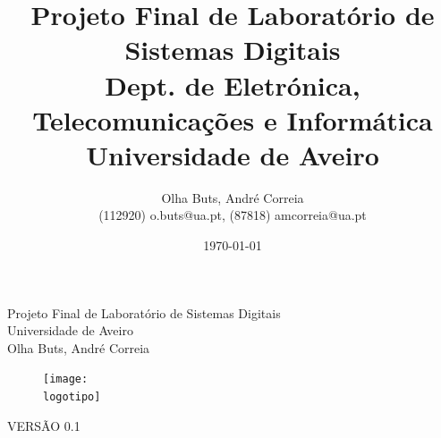 \documentclass{report}
\begin{document}
%
\def\titulo{Projeto Final de Laboratório de Sistemas Digitais}
\def\data{01 de Junho de 2023}
\def\autores{Olha Buts, André Correia}
\def\autorescontactos{(112920) o.buts@ua.pt, (87818) amcorreia@ua.pt}
\def\versao{VERSÃO 0.1}
\def\departamento{Dept. de Eletrónica, Telecomunicações e Informática}
\def\empresa{Universidade de Aveiro}
\def\logotipo{ua.pdf}
%
%
\begin{titlepage}

\begin{center}
%
\vspace*{50mm}
%
{\Huge \titulo}\\ 
%
\vspace{10mm}
%
{\Large \empresa}\\
%
\vspace{10mm}
%
{\LARGE \autores}\\ 
%
\vspace{30mm}
%
\begin{figure}[h]
\center
\texttt{[image: \\logotipo]}
\end{figure}
%
\vspace{30mm}
\end{center}
%
\begin{flushright}
\versao
\end{flushright}
\end{titlepage}

\title{%
{\Huge\textbf{\titulo}}\\
{\Large \departamento\\ \empresa}
}
%
\author{%
    \autores \\
    \autorescontactos
}
%
\date{\today}
%
\maketitle



\end{document}
